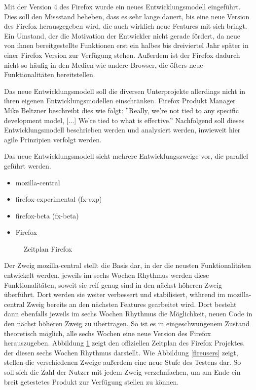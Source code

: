 Mit der Version 4 des Firefox wurde ein neues Entwicklungsmodell eingeführt. Dies soll den Missstand beheben, dass es sehr lange dauert, bis eine neue Version des Firefox herausgegeben wird, die auch wirklich neue Features mit sich bringt. Ein Umstand, der die Motivation der Entwickler nicht gerade fördert, da neue von ihnen bereitgestellte Funktionen erst ein halbes bis dreiviertel Jahr später in einer Firefox Version zur Verfügung stehen. Außerdem ist der Firefox dadurch nicht so häufig in den Medien wie andere Browser, die öfters neue Funktionalitäten bereitstellen.

Das neue Entwicklungsmodell soll die diversen Unterprojekte allerdings nicht in ihren eigenen Entwicklungsmodellen einschränken. Firefox Produkt Manager Mike Beltzner beschreibt dies wie folgt: ''Really, we're not tied to any specific development model, [...] We're tied to what is effective.'' \cite{bib:beltzner} Nachfolgend soll dieses Entwicklungsmodell beschrieben werden und analysiert werden, inwieweit hier agile Prinzipien verfolgt werden.

Das neue Entwicklungsmodell sieht mehrere Entwicklungszweige vor, die pa\-ra\-llel geführt werden.
\begin{itemize}
\item mozilla-central
\item firefox-experimental (fx-exp)
\item firefox-beta (fx-beta)
\item Firefox
\end{itemize}
\begin{figure}[h]
	\centering
	\caption{Zeitplan Firefox \cite{bib:fire-development}}
	\label{firett}
\end{figure}

Der Zweig mozilla-central stellt die Basis dar, in der die neusten Funktionalitäten entwickelt werden. jeweils im sechs Wochen Rhythmus werden diese Funktionalitäten, soweit sie reif genug sind in den nächst höheren Zweig überführt. Dort werden sie weiter verbessert und stabilisiert, während im mozilla-central Zweig bereits an den nächsten Features gearbeitet wird. Dort besteht dann ebenfalls jeweils im sechs Wochen Rhythmus die Möglichkeit, neuen Code in den nächst höheren Zweig zu übertragen. So ist es in eingeschwungenem Zustand theoretisch möglich,  alle sechs Wochen eine neue Version des Firefox herauszugeben. Abbildung \ref{firett} zeigt den offiziellen Zeitplan des Firefox Projektes. der diesen sechs Wochen Rhythmus darstellt. Wie Abbildung \ref{fireusers} zeigt, stellen die verschiedenen Zweige außerdem eine neue Stufe des Testens dar. So soll sich die Zahl der Nutzer mit jedem Zweig verzehnfachen, um am Ende ein breit getestetes Produkt zur Verfügung stellen zu können.

